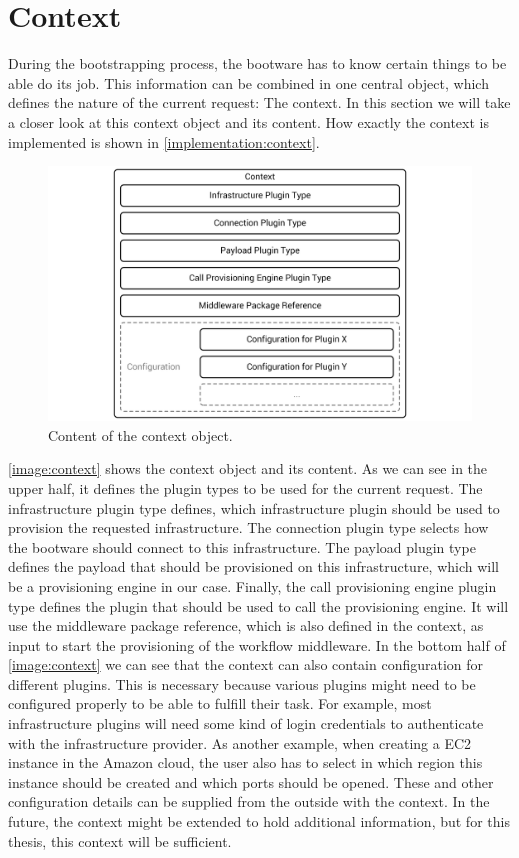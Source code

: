 \section{Context}
\label{design:context}

During the bootstrapping process, the bootware has to know certain things to be able do its job.
This information can be combined in one central object, which defines the nature of the current request: The context.
In this section we will take a closer look at this context object and its content.
How exactly the context is implemented is shown in \autoref{implementation:context}.

\begin{figure}[!htbp]
	\centering
	\includegraphics[resolution=600]{design/assets/context}
	\caption{Content of the context object.}
	\label{image:context}
\end{figure}

\autoref{image:context} shows the context object and its content.
As we can see in the upper half, it defines the plugin types to be used for the current request.
The infrastructure plugin type defines, which infrastructure plugin should be used to provision the requested infrastructure.
The connection plugin type selects how the bootware should connect to this infrastructure.
The payload plugin type defines the payload that should be provisioned on this infrastructure, which will be a provisioning engine in our case.
Finally, the call provisioning engine plugin type defines the plugin that should be used to call the provisioning engine.
It will use the middleware package reference, which is also defined in the context, as input to start the provisioning of the workflow middleware.
In the bottom half of \autoref{image:context} we can see that the context can also contain configuration for different plugins.
This is necessary because various plugins might need to be configured properly to be able to fulfill their task.
For example, most infrastructure plugins will need some kind of login credentials to authenticate with the infrastructure provider.
As another example, when creating a EC2 instance in the Amazon cloud, the user also has to select in which region this instance should be created and which ports should be opened.
These and other configuration details can be supplied from the outside with the context.
In the future, the context might be extended to hold additional information, but for this thesis, this context will be sufficient.

